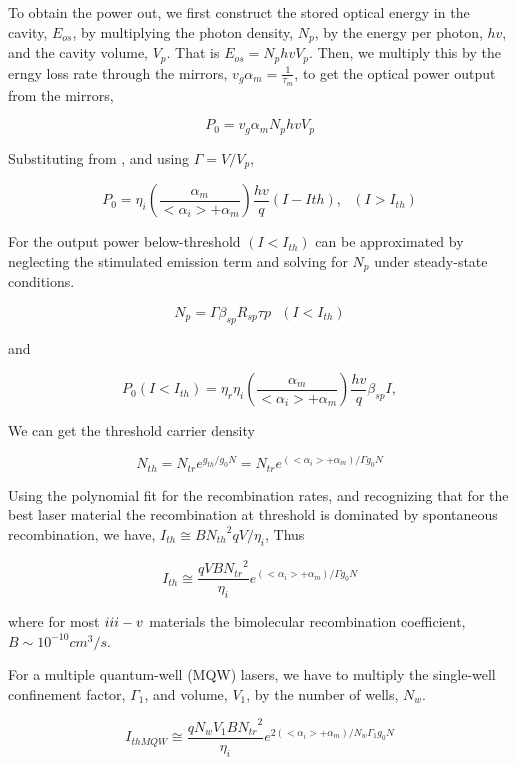 To obtain the power out, we first construct the stored optical energy in the
cavity, $E_{os}$, by multiplying the photon density, $N_p$, by the energy per
photon, $hv$, and the cavity volume, $V_p$. That is $E_{os} = N_phvV_p$. Then,
we multiply this by the erngy loss rate through the mirrors, $v_g\alpha_m =
\frac{1}{\tau_m}$, to get the optical power output from the mirrors,

\begin{equation}
  P_0 = v_g\alpha_{m}N_phvV_p
\end{equation}

Substituting from , and using $\Gamma = V/V_p$,

\begin{equation}
  P_0 = \eta_i(\frac{\alpha_m}{<\alpha_i> + \alpha_m})\frac{hv}{q}(I - I{th}),~~~(I > I_{th})
\end{equation}

For the output power below-threshold $(I < I_{th})$ can be approximated by neglecting the stimulated emission term and solving for $N_p$ under steady-state conditions.

\begin{equation}
N_p = \Gamma\beta_{sp}R_{sp}\tau{p}~~~(I < I_{th})
\end{equation}

and 

\begin{equation}
  P_0(I < I_{th}) = \eta_r\eta_i\left(\frac{\alpha_m}{<\alpha_i> + \alpha_m}\right)\frac{hv}{q}\beta_{sp}I,
\end{equation}


We can get the threshold carrier density

\begin{equation}
  N_{th} = N_{tr}e^{g_{th}/g_{0}N} = N_{tr}e^{(<\alpha_i> + \alpha_m)/\Gamma{g_{0}}N}
\end{equation}

Using the polynomial fit for the recombination rates, and recognizing that for
the best laser material the recombination at threshold is dominated by
spontaneous recombination, we have, $I_{th}\cong B{N_{th}}^2qV/\eta_i$, Thus

\begin{equation}
  I_{th} {\cong} \frac{qVB{N_{tr}}^2}{\eta_i}e^{(<\alpha_i> + \alpha_m)/\Gamma{g_0}N}
\end{equation}

where for most $\uppercase\expandafter{\romannumeral3} -
\uppercase\expandafter{\romannumeral5}$ materials the bimolecular recombination
coefficient, $B \sim 10^{-10} cm^3/s$.

For a multiple quantum-well (MQW) lasers, we have to multiply the single-well confinement factor, $\Gamma_1$, and volume, $V_1$, by the number of wells, $N_w$.


\begin{equation}
  I_{thMQW} {\cong} \frac{qN_{w}V_{1}B{N_{tr}}^2}{\eta_i}e^{2(<\alpha_i> + \alpha_m)/{N_w\Gamma_{1}g_{0}N}}
\end{equation}



